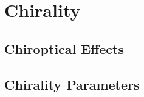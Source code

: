 \chapter{Chirality}\label{sec:background:Chirality}

\section{Chiroptical Effects}\label{sec:background:Chirality:Chiroptics}

\section{Chirality Parameters}\label{sec:background:Chirality:Paremeters}